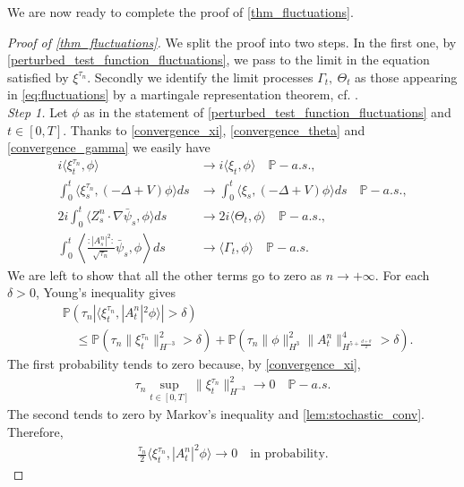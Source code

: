 \documentclass[a4paper,10pt]{amsart}
\newcommand{\wick}[1]{:\mathrel{#1}:}
\theoremstyle{remark}
\numberwithin{equation}{section}
\begin{document}
  
We are now ready to complete the proof of \cref{thm_fluctuations}.
\begin{proof}[Proof of \cref{thm_fluctuations}]
We split the proof into two steps. In the first one, by \cref{perturbed_test_function_fluctuations}, we pass to the limit in the equation satisfied by $\xi^{\tau_n}.$ Secondly we identify the limit processes $\Gamma_t,\ \Theta_t$ as those appearing in \eqref{eq:fluctuations} by a martingale representation theorem, cf. \cite[Theorem 8.2]{da2014stochastic}.\\
\emph{Step 1.} Let $\phi $ as in the statement of \cref{perturbed_test_function_fluctuations} and $t\in [0,T]$. Thanks to \eqref{convergence_xi}, \eqref{convergence_theta} and \eqref{convergence_gamma} we easily have
\begin{align*}
    i\langle \xi^{\tau_n}_t, \phi\rangle&\rightarrow i\langle \xi_t, \phi\rangle\quad\mathbb{P}-a.s.,
    \\
    \int_0^t \langle \xi^{\tau_n}_s, (-\Delta+V)\phi\rangle ds&\rightarrow \int_0^t \langle \xi_s, (-\Delta+V)\phi\rangle ds\quad\mathbb{P}-a.s.,\\
    2i\int_0^t \langle Z^{n}_s\cdot\nabla\bar{\psi}_s,\phi\rangle ds &\rightarrow 2i\langle \Theta_t,\phi\rangle\quad\mathbb{P}-a.s.,\\
    \int_0^t \left\langle
    \frac{\wick{|A^n_s|^2}}{\sqrt{\tau_n}}\bar{\psi}_s,\phi
    \right\rangle ds
    &\rightarrow \langle \Gamma_t,\phi\rangle\quad\mathbb{P}-a.s.
\end{align*}
We are left to show that all the other terms go to zero as $n\rightarrow +\infty$.
For each $\delta>0$, Young's inequality gives
\begin{align*}
    &\mathbb{P}\left(
    \tau_n|\langle \xi^{\tau_n}_t,|A^{n}_t|^2\phi\rangle|>\delta
    \right)\\
    &\quad\leq
    \mathbb{P}\left(\tau_n\|\xi^{\tau_n}_t\|_{H^{-3}}^2>\delta\right)
    +\mathbb{P}\left(
    \tau_n\|\phi\|_{H^3}^2
    \|A^{n}_t\|_{H^{5+\frac{d+\theta}{2}}}^4>\delta\right).
\end{align*}
The first probability tends to zero because, by \eqref{convergence_xi},
\begin{align*}
\tau_n\sup_{t\in[0,T]}\|\xi^{\tau_n}_t\|_{H^{-3}}^2
\longrightarrow0\quad\mathbb{P}-a.s.
\end{align*}
The second tends to zero by Markov's inequality and
\cref{lem:stochastic_conv}. Therefore,
\begin{align*}
    \frac{\tau_n}{2}\langle \xi^{\tau_n}_t,|A^{n}_t|^2\phi\rangle\rightarrow 0\quad\mbox{in probability.}

\end{align*}
\end{proof}
\end{document}
